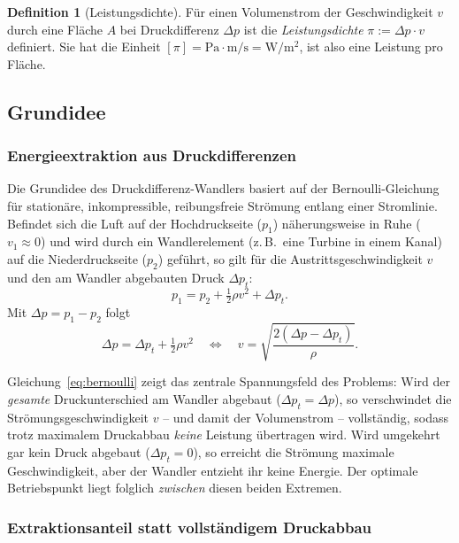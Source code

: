 ﻿\documentclass[a4paper,12pt]{article}
\theoremstyle{definition}
\newtheorem{definition}{Definition}
\begin{document}
\begin{definition}[Leistungsdichte]
	Für einen Volumenstrom der Geschwindigkeit $v$ durch eine Fläche $A$
	bei Druckdifferenz $\Delta p$ ist die \emph{Leistungsdichte}
	$\pi := \Delta p \cdot v$ definiert. Sie hat die Einheit
	$[\pi] = \mathrm{Pa} \cdot \mathrm{m/s} = \mathrm{W/m^2}$, ist also
	eine Leistung pro Fläche.
\end{definition}

\subsection{Grundidee}

\subsubsection{Energieextraktion aus Druckdifferenzen}

Die Grundidee des Druckdifferenz-Wandlers basiert auf der
Bernoulli-Gleichung für stationäre, inkompressible, reibungsfreie
Strömung entlang einer Stromlinie. Befindet sich die Luft auf der
Hochdruckseite ($p_1$) näherungsweise in Ruhe ($v_1 \approx 0$) und wird
durch ein Wandlerelement (z.\,B.\ eine Turbine in einem Kanal) auf die
Niederdruckseite ($p_2$) geführt, so gilt für die Austrittsgeschwindigkeit
$v$ und den am Wandler abgebauten Druck $\Delta p_t$:
\[
	p_1 = p_2 + \tfrac{1}{2}\rho v^2 + \Delta p_t.
\]
Mit $\Delta p = p_1 - p_2$ folgt
\begin{equation}
	\label{eq:bernoulli}
	\Delta p = \Delta p_t + \tfrac{1}{2}\rho v^2
	\quad\Longleftrightarrow\quad
	v = \sqrt{\frac{2(\Delta p - \Delta p_t)}{\rho}}.
\end{equation}

Gleichung~\eqref{eq:bernoulli} zeigt das zentrale Spannungsfeld des
Problems: Wird der \emph{gesamte} Druckunterschied am Wandler abgebaut
($\Delta p_t = \Delta p$), so verschwindet die Strömungsgeschwindigkeit
$v$ -- und damit der Volumenstrom -- vollständig, sodass trotz maximalem
Druckabbau \emph{keine} Leistung übertragen wird. Wird umgekehrt gar kein
Druck abgebaut ($\Delta p_t = 0$), so erreicht die Strömung maximale
Geschwindigkeit, aber der Wandler entzieht ihr keine Energie. Der
optimale Betriebspunkt liegt folglich \emph{zwischen} diesen beiden
Extremen.

\subsubsection{Extraktionsanteil statt vollständigem Druckabbau}
\end{document}
